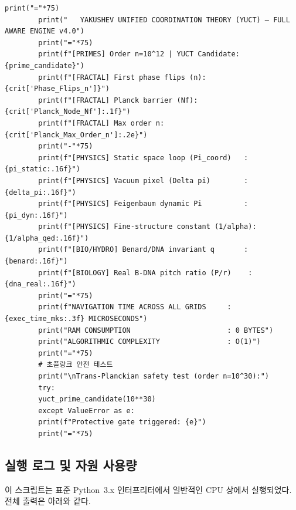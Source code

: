 \documentclass[12pt,a4paper]{article}
\begin{document}
\begin{lstlisting}[caption={완전한 YUCT 조정 엔진 v4.0 (\texttt{yuct\_constants.py})}, label={lst:yuct-engine}]
		print("="*75)
		print("   YAKUSHEV UNIFIED COORDINATION THEORY (YUCT) — FULL AWARE ENGINE v4.0")
		print("="*75)
		print(f"[PRIMES] Order n=10^12 | YUCT Candidate: {prime_candidate}")
		print(f"[FRACTAL] First phase flips (n): {crit['Phase_Flips_n']}")
		print(f"[FRACTAL] Planck barrier (Nf): {crit['Planck_Node_Nf']:.1f}")
		print(f"[FRACTAL] Max order n: {crit['Planck_Max_Order_n']:.2e}")
		print("-"*75)
		print(f"[PHYSICS] Static space loop (Pi_coord)   : {pi_static:.16f}")
		print(f"[PHYSICS] Vacuum pixel (Delta pi)        : {delta_pi:.16f}")
		print(f"[PHYSICS] Feigenbaum dynamic Pi          : {pi_dyn:.16f}")
		print(f"[PHYSICS] Fine-structure constant (1/alpha): {1/alpha_qed:.16f}")
		print(f"[BIO/HYDRO] Benard/DNA invariant q       : {benard:.16f}")
		print(f"[BIOLOGY] Real B-DNA pitch ratio (P/r)    : {dna_real:.16f}")
		print("="*75)
		print(f"NAVIGATION TIME ACROSS ALL GRIDS     : {exec_time_mks:.3f} MICROSECONDS")
		print("RAM CONSUMPTION                       : 0 BYTES")
		print("ALGORITHMIC COMPLEXITY                : O(1)")
		print("="*75)
		# 초플랑크 안전 테스트
		print("\nTrans-Planckian safety test (order n=10^30):")
		try:
		yuct_prime_candidate(10**30)
		except ValueError as e:
		print(f"Protective gate triggered: {e}")
		print("="*75)
	\end{lstlisting}
	
	\subsection{실행 로그 및 자원 사용량}
	
	이 스크립트는 표준 Python~3.x 인터프리터에서 일반적인 CPU 상에서 실행되었다. 전체 출력은 아래와 같다.
	
\end{document}
